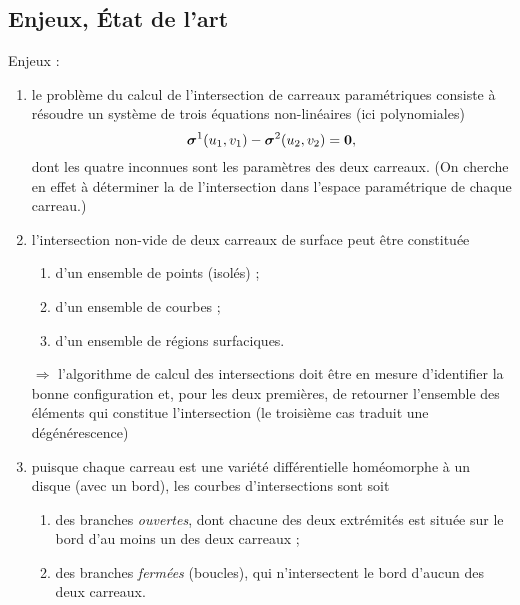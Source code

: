 \subsection{Enjeux, État de l'art}
Enjeux :
\begin{enumerate}
	\item le problème du calcul de l'intersection de carreaux paramétriques consiste à résoudre un système de trois équations non-linéaires (ici polynomiales)
	\begin{equation}
		\bm{\sigma}^1(u_1,v_1) - \bm{\sigma}^2(u_2, v_2) = \bm{0},
	\end{equation}
	dont les quatre inconnues sont les paramètres des deux carreaux. 
	(On cherche en effet à déterminer la  de l'intersection dans l'espace paramétrique de chaque carreau.)
	\item l'intersection non-vide de deux carreaux de surface peut être constituée
	\begin{enumerate}
		\item d'un ensemble de points (isolés) ;
		\item d'un ensemble de courbes ;
		\item d'un ensemble de régions surfaciques.
	\end{enumerate}
	$\Rightarrow$ l'algorithme de calcul des intersections doit être en mesure d'identifier la bonne configuration et, pour les deux premières, de retourner l'ensemble des éléments qui constitue l'intersection (le troisième cas traduit une dégénérescence)
	\item puisque chaque carreau est une variété différentielle homéomorphe à un disque (\ie avec un bord), les courbes d'intersections sont soit 
	\begin{enumerate}
		\item des branches \textit{ouvertes}, dont chacune des deux extrémités est située sur le bord d'au moins un des deux carreaux ;
		\item des branches \textit{fermées} (boucles), qui n'intersectent le bord d'aucun des deux carreaux.
	\end{enumerate}
\end{enumerate}

